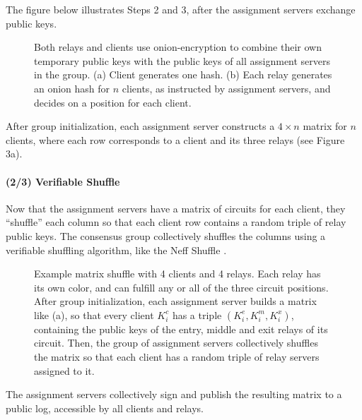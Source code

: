 The figure below illustrates Steps 2 and 3, after the assignment servers
exchange public keys.

\begin{figure}[htbp]
  \centering
  \caption{Both relays and clients use onion-encryption to combine their own
  temporary public keys with the public keys of all assignment servers in the group. (a) Client generates one hash. (b) Each relay generates an onion hash for $n$ clients, as instructed by assignment servers, and decides on a position
  for each client.}
\end{figure}

After group initialization, each assignment server constructs a $4 \times n$ matrix for $n$ clients, where each row corresponds to a client and its three relays (see Figure 3a). 

\paragraph{(2/3) Verifiable Shuffle}
Now that the assignment servers have a matrix of circuits for each client, they
``shuffle'' each column so that each client row contains a random triple of
relay public keys. The consensus group collectively shuffles the columns using
a verifiable shuffling algorithm, like the Neff Shuffle \cite{neff2001verifiable}.

\begin{figure}[htb]
\centering
\hspace{\fill}%
\hspace{\fill}%
\hspace*{\fill}%
\caption[bla]{Example matrix shuffle with 4 clients and 4 relays. Each relay
has its own color, and can fulfill any or all of the three circuit positions.
After group initialization, each assignment server builds a matrix like (a), 
so that  every client $K^c_i$ has a triple $(K^e_i, K^m_i, K^x_i)$, containing the public keys of the entry, middle and exit relays of its circuit. Then, the
group of assignment servers collectively shuffles the matrix so that each client has a random triple of relay servers assigned to it.}
\end{figure}

The assignment servers collectively sign and publish the resulting matrix to a public log, accessible by all clients and relays. 

